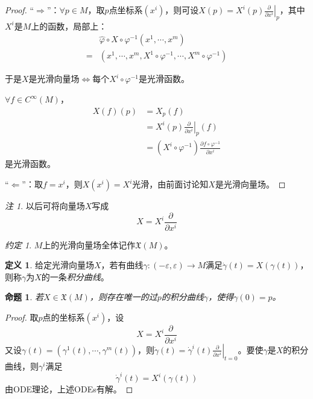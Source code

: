 \documentclass[winfonts,UTF8,c5size,a4paper,fancyhdr,hyperref,titlepage,nocap]{ctexart}
\newtheorem{prop}[thm]{命题}
\theoremstyle{definition}
\newtheorem{defn}[thm]{定义}
\theoremstyle{remark}
\newtheorem*{rem}{注}
\newtheorem*{note}{约定}
\numberwithin{equation}{subsection}
\newcommand{\red}{\color{red}}
\newcommand{\pfrac}[2]{\frac{\partial{#1}}{\partial{#2}}}
\newcommand{\px}[1]{\left.\pfrac{}{x^{#1}}\right|_p}
\newcommand{\Xf}[1]{\mathfrak{X}(#1)}
\newcommand{\local}[2]{\left.{#1}\right|_{#2}}%
\newcommand{\localt}[1]{\local{#1}{t=0}}%
\begin{document}
\begin{proof}
  “$\Rightarrow$”：$\forall p\in M$，取$p$点坐标系$(x^i)$，则可设$X(p)=X^i(p)\px{i}$，其中$X^i$是$M$上的函数，局部上：
\begin{align*}
 &\widehat{\varphi}\circ X\circ\varphi^{-1}(x^1,\cdots,x^m)\\
=&(x^1,\cdots,x^m,X^1\circ\varphi^{-1},\cdots,X^m\circ\varphi^{-1})
\end{align*}

于是$X$是光滑向量场$\Leftrightarrow$每个$X^i\circ\varphi^{-1}$是光滑函数。

$\forall f\in C^{\infty}(M)$，
\begin{align*}
X(f)(p)&=X_p(f)\\
       &=X^i(p)\px{i}(f)\\
       &=(X^i\circ\varphi^{-1})\pfrac{f\circ\varphi^{-1}}{x^i}
\end{align*}
是光滑函数。

“$\Leftarrow$”：取$f=x^i$，则$X(x^i)=X^i$光滑，由前面讨论知$X$是光滑向量场。

\end{proof}
\begin{rem}
  以后可将向量场$X$写成
\begin{equation*}
X=X^i\pfrac{}{x^i}
\end{equation*}
\end{rem}
\begin{note}
$M$上的光滑向量场全体记作$\Xf{M}$。
\end{note}
\begin{defn}
  给定光滑向量场$X$，若有曲线$\gamma\colon(-\varepsilon,\varepsilon)\to M$满足$\dot{\gamma}(t)=X(\gamma(t))$，则称$\gamma$为$X$的一条\emph{\red 积分曲线}。
\end{defn}
\begin{prop}
  若$X\in\Xf{M}$，则存在唯一的过$p$的积分曲线$\gamma$，使得$\gamma(0)=p$。
\end{prop}
\begin{proof}
取$p$点的坐标系$(x^i)$，设
\begin{equation*}
X=X^i\pfrac{}{x^i}
\end{equation*}
又设$\gamma(t)=(\gamma^1(t),\cdots,\gamma^m(t))$，则$\dot{\gamma}(t)=\localt{\dot{\gamma}^i(t)\pfrac{}{x^i}}$。要使$\gamma$是$X$的积分曲线，则$\gamma^i$满足
\begin{equation*}
\dot{\gamma}^i(t)=X^i(\gamma(t))
\end{equation*}
由ODE理论，上述ODEs有解。
\end{proof}
\end{document}
